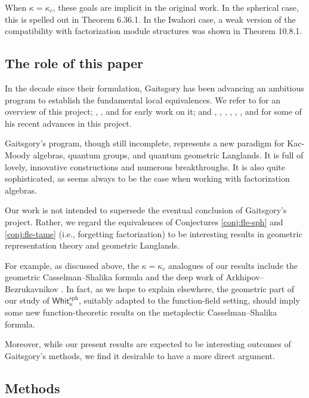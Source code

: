 \documentclass[11pt,reqno]{amsart}
\newcommand{\on}{\operatorname}
\theoremstyle{remark}
\numberwithin{equation}{section}
\newcommand{\Whit}{\mathsf{Whit}}
\begin{document}
When $\kappa = \kappa_c$, these goals are 
implicit in the original work. 
In the spherical case, this is spelled out 
in \cite{cpsi} Theorem 6.36.1.
In the Iwahori case, a weak version of the 
compatibility with factorization module structures
was shown in \cite{cpsii} Theorem 10.8.1.

\subsection{The role of this paper}

In the decade since their formulation, Gaitsgory has been 
advancing an ambitious program
to establish the fundamental local equivalences.
We refer to \cite{paris-notes} for an overview
of this project;
\cite{gtw}, \cite{fact9}, and \cite{fact9} for early work on it;
and \cite{fact3}, \cite{fact6},
\cite{fact7}, \cite{fact5}, \cite{fact1}, \cite{fact2}, and \cite{fact8}
for some of his recent advances in this project.

Gaitsgory's program, though still incomplete, represents 
a new paradigm for Kac-Moody algebras, quantum groups, and 
quantum geometric Langlands. It is full of lovely,
innovative constructions and numerous breakthroughs. 
It is also quite sophisticated, as seems always to be the case
when working with factorization algebras.

Our work is not intended to 
supersede the eventual conclusion of Gaitsgory's project.
Rather, we regard the equivalences of Conjectures \ref{conj:fle-sph} and
\ref{conj:fle-tame} (i.e., forgetting factorization) 
to be interesting results in geometric representation theory
and geometric Langlands. 

For example, as discussed above, the $\kappa = \kappa_c$ analogues of our
results include the geometric Casselman--Shalika formula \cite{fgv}
and the deep work of Arkhipov--Bezrukavnikov \cite{ab}. In fact, as 
we hope to 
explain elsewhere, the geometric part of our study of 
$\Whit_{\kappa}^{\on{sph}}$, suitably adapted to the 
function-field setting, should imply some new function-theoretic results on  
the 
metaplectic Casselman--Shalika formula. 

Moreover, while our present results are expected to be interesting outcomes
of Gaitsgory's methods, we find it desirable to have a 
more direct argument.


\subsection{Methods}\label{ss:methods}
\end{document}
